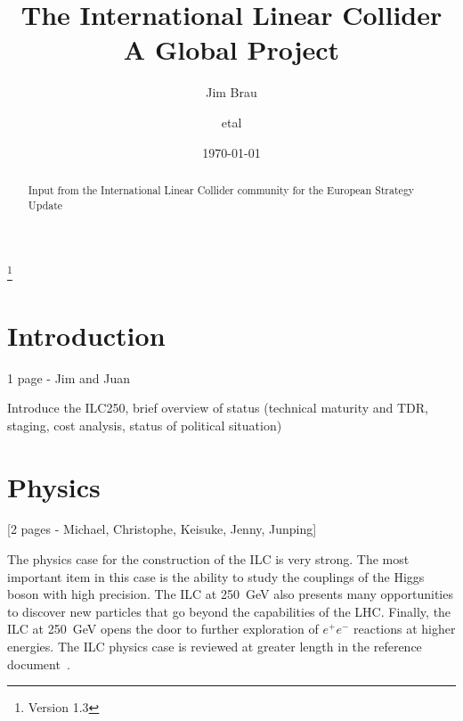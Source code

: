 \documentclass[%
 reprint,
 amsmath,amssymb,
 aps,
]{revtex4-1}
\def\ee{e^+e^-}
\begin{document}

\title{The International Linear Collider \\ A Global Project}%
\thanks{Version 1.3}%

\author{Jim Brau}
\author{etal}%
%


\date{\today}%

\begin{abstract}
Input from the International Linear Collider community for the European Strategy Update 

\end{abstract}

\maketitle


\section{\label{sec:intro}Introduction}

1 page - Jim and Juan

    Introduce the ILC250, brief overview of status (technical maturity and TDR, staging, cost analysis, status of political situation)


\section{\label{sec:phys}Physics}

[2 pages - Michael, Christophe, Keisuke, Jenny, Junping]

The physics case for the construction of the ILC is very strong.   The
most important item in this case is the ability to study the couplings
of the Higgs boson with high precision.  The ILC at 250~GeV also
presents many opportunities to discover new particles that go beyond
the capabilities of the LHC.  Finally, the ILC at 250~GeV opens the
door to further exploration of $\ee$ reactions at higher energies. 
The ILC physics case is reviewed at greater length in the reference
document~\cite{ILCforESS}. 
\end{document}
